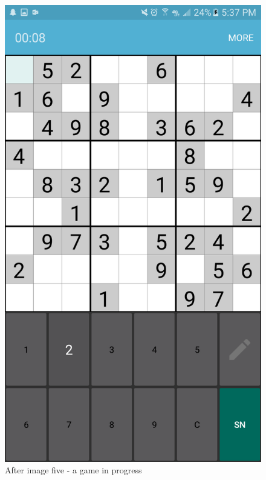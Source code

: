 \documentclass[10pt]{article}
\begin{document}
\begin{figure}
\includegraphics[width=\linewidth]{img/after5.png}
\caption{After image five - a game in progress}
\end{figure}
\end{document}
